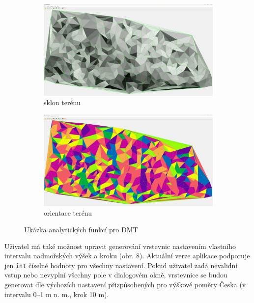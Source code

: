 \begin{figure}[H]
\medskip %
\begin{subfigure}{.475\linewidth}
  \includegraphics[width=\linewidth]{images/slopeshowcase.png}
  \caption{sklon terénu}
  \label{velcomp}
\end{subfigure}\hfill %
\begin{subfigure}{.475\linewidth}
  \includegraphics[width=\linewidth]{images/aspectshowcase.png}
  \caption{orientace terénu}
  \label{estcomp}
\end{subfigure}

\caption{Ukázka analytických funkcí pro DMT}
\label{fig:roc}
\end{figure}

\par Uživatel má také možnost upravit generování vrstevnic nastavením vlastního intervalu nadmořských výšek a kroku (obr. 8). Aktuální verze aplikace podporuje jen \verb|int| číselné hodnoty pro všechny nastavení. Pokud uživatel zadá nevalidní vstup nebo nevyplní všechny pole v dialogovém okně, vrstevnice se budou generovat dle výchozích nastavení přizpůsobených pro výškové poměry Česka (v intervalu 0–1 m n. m., krok 10 m).

